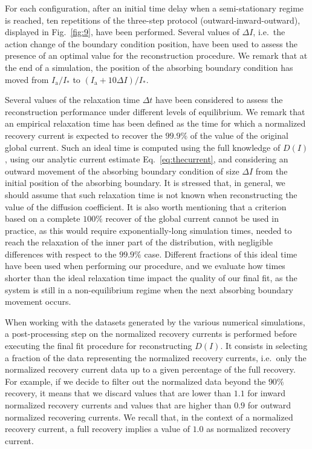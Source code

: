 For each configuration, after an initial time delay when a semi-stationary regime is reached, ten repetitions of the three-step protocol (outward-inward-outward), displayed in Fig.~\ref{fig:9}, have been performed. Several values of $\Delta I$, i.e.\ the action change of the boundary condition position, have been used to assess the presence of an optimal value for the reconstruction procedure. We remark that at the end of a simulation, the position of the absorbing boundary condition has moved from $I_\mathrm{a}/I_\ast$ to $(I_\mathrm{a} + 10\Delta I) / I_\ast$. 

Several values of the relaxation time $\Delta t$ have been considered to assess the reconstruction performance under different levels of equilibrium. We remark that an empirical relaxation time has been defined as the time for which a normalized recovery current is expected to recover the $99.9\%$ of the value of the original global current. Such an ideal time is computed using the full knowledge of $D(I)$, using our analytic current estimate Eq.~\eqref{eq:thecurrent}, and considering an outward movement of the absorbing boundary condition of size $\Delta I$ from the initial position of the absorbing boundary. It is stressed that, in general, we should assume that such relaxation time is not known when reconstructing the value of the diffusion coefficient. It is also worth mentioning that a criterion based on a complete $100\%$ recover of the global current cannot be used in practice, as this would require exponentially-long simulation times, needed to reach the relaxation of the inner part of the distribution, with negligible differences with respect to the $99.9\%$ case. Different fractions of this ideal time have been used when performing our procedure, and we evaluate how times shorter than the ideal relaxation time impact the quality of our final fit, as the system is still in a non-equilibrium regime when the next absorbing boundary movement occurs.

When working with the datasets generated by the various numerical simulations, a post-processing step on the normalized recovery currents is performed before executing the final fit procedure for reconstructing $D(I)$. It consists in selecting a fraction of the data representing the normalized recovery currents, i.e.\ only the normalized recovery current data up to a given percentage of the full recovery. For example, if we decide to filter out the normalized data beyond the $90\%$ recovery, it means that we discard values that are lower than $1.1$ for inward normalized recovery currents and values that are higher than $0.9$ for outward normalized recovering currents. We recall that, in the context of a normalized recovery current, a full recovery implies a value of $1.0$ as normalized recovery current.

